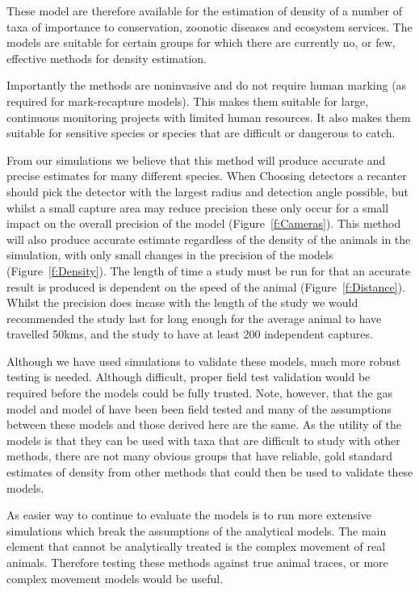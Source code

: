 \documentclass[a4paper,10pt,reqno,oneside]{amsart}
\begin{document}
These model are therefore available for the estimation of density of a number of taxa of importance to conservation, zoonotic diseases and ecosystem services. The models are suitable for certain groups for which there are currently no, or few, effective methods for density estimation. 

Importantly the methods are noninvasive and do not require human marking (as required for mark-recapture models). This makes them suitable for large, continuous monitoring projects with limited human resources. It also makes them suitable for sensitive species or species that are difficult or dangerous to catch.

From our simulations  we believe that this method will produce accurate and precise estimates for many different species. When Choosing detectors a recanter should pick the detector with the largest radius and detection angle possible, but whilst a small capture area may reduce precision these only occur for a small impact on the overall precision of the model (Figure~\ref{f:Cameras}). This method will also produce accurate estimate regardless of the density of the animals in the simulation, with only small changes in the precision of the models (Figure~\ref{f:Density}). The length of time a study must be run for that an accurate result is produced is dependent on the speed of the animal (Figure~\ref{f:Distance}). Whilst the precision does incase with the length of the study we would recommended the study last for long enough for the average animal to have travelled 50kms, and the study to have at least 200 independent captures.   

Although we have used simulations to validate these models, much more robust testing is needed. Although difficult, proper field test validation would be required before the models could be fully trusted. Note, however, that the gas model and model of \cite{rowcliffe2008estimating} have been been field tested and many of the assumptions between these models and those derived here are the same. As the utility of the models is that they can be used with taxa that are difficult to study with other methods, there are not many obvious groups that have reliable, gold standard estimates of density from other methods that could then be used to validate these models.

As easier way to continue to evaluate the models is to run more extensive simulations which break the assumptions of the analytical models. The main element that cannot be analytically treated is the complex movement of real animals. Therefore testing these methods against true animal traces, or more complex movement models would be useful.
\end{document}
